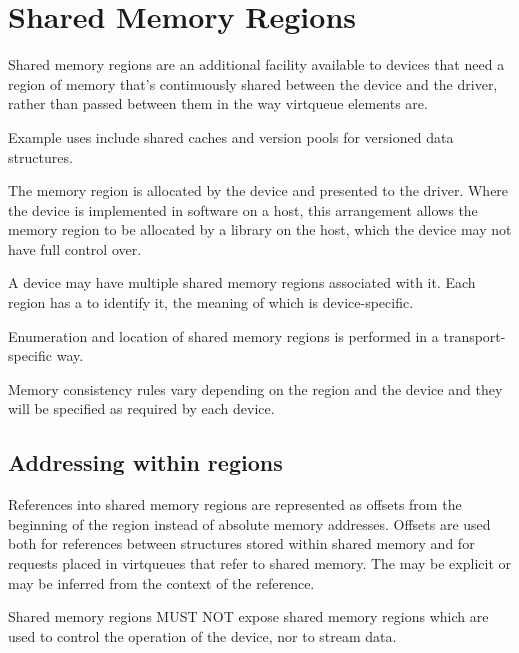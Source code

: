 \section{Shared Memory Regions}\label{sec:Basic Facilities of a Virtio Device / Shared Memory Regions}

Shared memory regions are an additional facility
available to devices that need a region of memory that's
continuously shared between the device and the driver, rather
than passed between them in the way virtqueue elements are.

Example uses include shared caches and version pools for versioned
data structures.

The memory region is allocated by the device and presented to the
driver.  Where the device is implemented in software on a host,
this arrangement allows the memory region to be allocated by
a library on the host, which the device may not have full control
over.

A device may have multiple shared memory regions associated with
it.  Each region has a  to identify it, the meaning
of which is device-specific.

Enumeration and location of shared memory regions is performed
in a transport-specific way.

Memory consistency rules vary depending on the region and the
device and they will be specified as required by each device.

\subsection{Addressing within regions}\label{sec:Basic Facilities of a Virtio Device / Shared Memory Regions / Addressing within regions }

References into shared memory regions are represented as offsets from
the beginning of the region instead of absolute memory addresses.
Offsets are used both for references between structures stored
within shared memory and for requests placed in virtqueues that
refer to shared memory.
The  may be explicit or may be inferred from the
context of the reference.

Shared memory regions MUST NOT expose shared memory regions which
are used to control the operation of the device, nor to stream
data.

